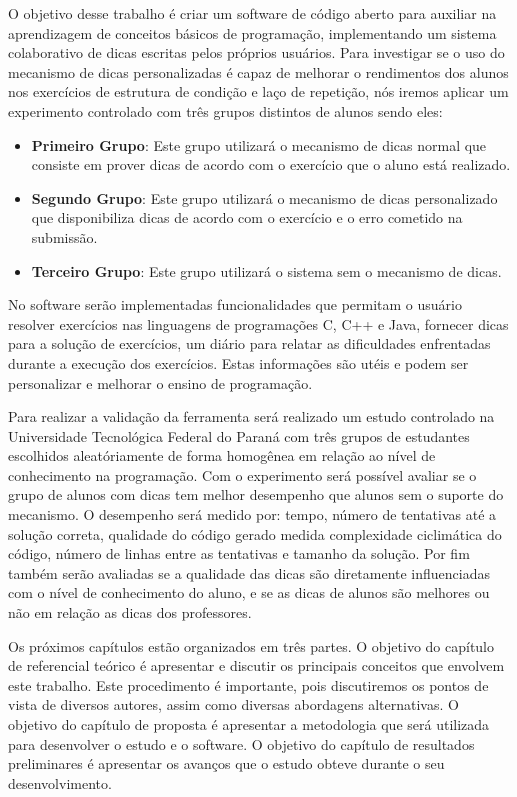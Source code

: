 O objetivo desse trabalho é criar um software de código aberto para auxiliar na aprendizagem de conceitos básicos de programação, implementando um sistema colaborativo de dicas escritas pelos próprios usuários. Para investigar se o uso do mecanismo de dicas personalizadas é capaz de melhorar o rendimentos dos alunos nos exercícios de estrutura de condição e laço de repetição, nós iremos aplicar um experimento controlado com três grupos distintos de alunos sendo eles:

\begin{itemize}
	\item \textbf{Primeiro Grupo}: Este grupo utilizará o mecanismo de dicas normal que consiste em prover dicas de acordo com o exercício que o aluno está realizado.
	
	\item \textbf{Segundo Grupo}: Este grupo utilizará o mecanismo de dicas personalizado que disponibiliza dicas de acordo com o exercício e o erro cometido na submissão.
	
	\item \textbf{Terceiro Grupo}: Este grupo utilizará o sistema sem o mecanismo de dicas.
	
\end{itemize}

No software serão implementadas funcionalidades que permitam o usuário resolver exercícios nas linguagens de programações C, C++ e Java, fornecer dicas para a solução de exercícios, um diário para relatar as dificuldades enfrentadas durante a execução dos exercícios. Estas informações são utéis e podem ser personalizar e melhorar o ensino de programação.

Para realizar a validação da ferramenta será realizado um estudo controlado na Universidade Tecnológica Federal do Paraná com três grupos de estudantes escolhidos aleatóriamente de forma homogênea em relação ao nível de conhecimento na programação. Com o experimento será possível avaliar se o grupo de alunos com dicas tem melhor desempenho que alunos sem o suporte do mecanismo. O desempenho será medido por: tempo, número de tentativas até a solução correta, qualidade do código gerado medida complexidade ciclimática do código, número de linhas entre as tentativas e tamanho da solução. Por fim também serão avaliadas se a qualidade das dicas são diretamente influenciadas com o nível de conhecimento do aluno, e se as dicas de alunos são melhores ou não em relação as dicas dos professores.

Os próximos capítulos estão organizados em três partes. O objetivo do capítulo de referencial teórico é apresentar e discutir os principais conceitos que envolvem este trabalho. Este  procedimento é importante, pois discutiremos os pontos de vista de diversos autores, assim como diversas abordagens alternativas. O objetivo do capítulo de proposta é apresentar a metodologia que será utilizada para desenvolver o estudo e o software. O objetivo do capítulo de resultados preliminares é apresentar os avanços que o estudo obteve durante o seu desenvolvimento.